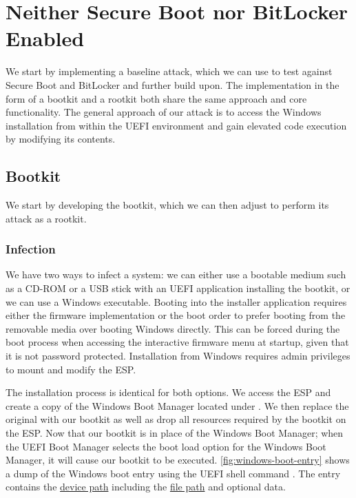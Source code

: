 
\section{Neither Secure Boot nor BitLocker Enabled}
\label{sec:attacks:neither}

We start by implementing a baseline attack, which we can use to test against Secure Boot and BitLocker and further build upon.
The implementation in the form of a bootkit and a rootkit both share the same approach and core functionality.
The general approach of our attack is to access the Windows installation from within the \ac{UEFI} environment and gain elevated code execution by modifying its contents.

\subsection{Bootkit}
\label{sec:attacks:neither:bootkit}

We start by developing the bootkit, which we can then adjust to perform its attack as a rootkit.

\subsubsection{Infection}

We have two ways to infect a system: we can either use a bootable medium such as a CD-ROM or a \ac{USB} stick with an \ac{UEFI} application installing the bootkit, or we can use a Windows executable.
Booting into the installer application requires either the firmware implementation or the boot order to prefer booting from the removable media over booting Windows directly.
This can be forced during the boot process when accessing the interactive firmware menu at startup, given that it is not password protected.
Installation from Windows requires admin privileges to mount and modify the \ac{ESP}.

The installation process is identical for both options.
We access the \ac{ESP} and create a copy of the Windows Boot Manager located under .
We then replace the original with our bootkit as well as drop all resources required by the bootkit on the \ac{ESP}.
Now that our bootkit is in place of the Windows Boot Manager; when the \ac{UEFI} Boot Manager selects the boot load option for the Windows Boot Manager, it will cause our bootkit to be executed.
\autoref{fig:windows-boot-entry} shows a dump of the Windows boot entry using the \ac{UEFI} shell command .
The entry contains the \hyperref[lst:device-path-protocol]{device path} including the \hyperref[lst:device-path-protocol]{file path} and optional data.

